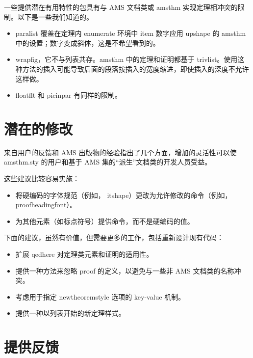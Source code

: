 \documentclass{article}
\newcommand{\ntt}{%
  \fontfamily\ttdefault \fontseries\mddefault \fontshape\updefault
  \selectfont
}
\DeclareRobustCommand{\cn}[1]{{\ntt\bslchar#1}}
\DeclareRobustCommand{\pkg}[1]{\textsf{#1}}
\DeclareRobustCommand{\env}[1]{{\ntt#1}}
\begin{document}
一些提供潜在有用特性的包具有与 AMS 文档类或 \pkg{amsthm} 实现定理相冲突的限制。以下是一些我们知道的。
\begin{itemize}
\itemsep=.5\itemsep
\item \pkg{paralist} 覆盖在定理内 \env{enumerate} 环境中 item 数字应用 \cn{upshape} 的 \pkg{amsthm} 中的设置；数字变成斜体，这是不希望看到的。
\item \pkg{wrapfig}，它不与列表共存。\pkg{amsthm} 中的定理和证明都基于 \cn{trivlist}。使用这种方法的插入可能导致后面的段落按插入的宽度缩进，即使插入的深度不允许这样做。
\item \pkg{floatflt} 和 \pkg{picinpar} 有同样的限制。
\end{itemize}


\section{潜在的修改}

来自用户的反馈和 AMS 出版物的经验指出了几个方面，增加的灵活性可以使 \pkg{amsthm.sty} 的用户和基于 AMS 集的“派生”文档类的开发人员受益。

这些建议比较容易实施：

\begin{itemize}
\item 将硬编码的字体规范（例如，\cn{itshape}）更改为允许修改的命令（例如，\cn{proofheadingfont}）。
\item 为其他元素（如标点符号）提供命令，而不是硬编码的值。
\end{itemize}

下面的建议，虽然有价值，但需要更多的工作，包括重新设计现有代码：

\begin{itemize}
\item 扩展 \cn{qedhere} 对定理类元素和证明的适用性。
\item 提供一种方法来忽略 \env{proof} 的定义，以避免与一些非 AMS 文档类的名称冲突。
\item 考虑用于指定 \cn{newtheoremstyle} 选项的 key-value 机制。
\item 提供一种以列表开始的新定理样式。
\end{itemize}


\section{提供反馈}
\end{document}
